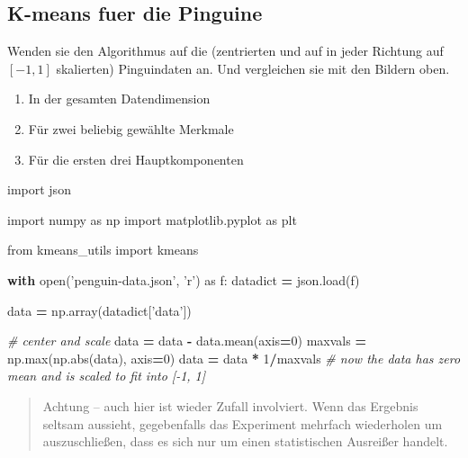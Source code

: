\documentclass[]{book}
\newenvironment{Shaded}{\begin{snugshade}}{\end{snugshade}}
\newcommand{\BuiltInTok}[1]{#1}
\newcommand{\CommentTok}[1]{\textcolor[rgb]{0.56,0.35,0.01}{\textit{#1}}}
\newcommand{\ControlFlowTok}[1]{\textcolor[rgb]{0.13,0.29,0.53}{\textbf{#1}}}
\newcommand{\DecValTok}[1]{\textcolor[rgb]{0.00,0.00,0.81}{#1}}
\newcommand{\ImportTok}[1]{#1}
\newcommand{\NormalTok}[1]{#1}
\newcommand{\OperatorTok}[1]{\textcolor[rgb]{0.81,0.36,0.00}{\textbf{#1}}}
\newcommand{\StringTok}[1]{\textcolor[rgb]{0.31,0.60,0.02}{#1}}
\providecommand{\tightlist}{%
  \setlength{\itemsep}{0pt}\setlength{\parskip}{0pt}}
\newenvironment {JHSAYS} [0] {\begin{quote}\color{jhsc}} {\end{quote}}
\theoremstyle{definition}
\theoremstyle{definition}
\theoremstyle{definition}
\theoremstyle{definition}
\theoremstyle{remark}
\begin{document}
\hypertarget{k-means-fuer-die-pinguine}{%
\subsection{K-means fuer die Pinguine}\label{k-means-fuer-die-pinguine}}

Wenden sie den Algorithmus auf die (zentrierten und auf in jeder Richtung auf \([-1, 1]\) skalierten) Pinguindaten an. Und vergleichen sie mit den Bildern oben.

\begin{enumerate}
\def\labelenumi{\arabic{enumi}.}
\tightlist
\item
  In der gesamten Datendimension
\item
  Für zwei beliebig gewählte Merkmale
\item
  Für die ersten drei Hauptkomponenten
\end{enumerate}

\begin{Shaded}
\begin{Highlighting}[]
\ImportTok{import}\NormalTok{ json}

\ImportTok{import}\NormalTok{ numpy }\ImportTok{as}\NormalTok{ np}
\ImportTok{import}\NormalTok{ matplotlib.pyplot }\ImportTok{as}\NormalTok{ plt}

\ImportTok{from}\NormalTok{ kmeans_utils }\ImportTok{import}\NormalTok{ kmeans}

\ControlFlowTok{with} \BuiltInTok{open}\NormalTok{(}\StringTok{'penguin-data.json'}\NormalTok{, }\StringTok{'r'}\NormalTok{) }\ImportTok{as}\NormalTok{ f:}
\NormalTok{    datadict }\OperatorTok{=}\NormalTok{ json.load(f)}

\NormalTok{data }\OperatorTok{=}\NormalTok{ np.array(datadict[}\StringTok{'data'}\NormalTok{])}

\CommentTok{# center and scale}
\NormalTok{data }\OperatorTok{=}\NormalTok{ data }\OperatorTok{-}\NormalTok{ data.mean(axis}\OperatorTok{=}\DecValTok{0}\NormalTok{)}
\NormalTok{maxvals }\OperatorTok{=}\NormalTok{ np.}\BuiltInTok{max}\NormalTok{(np.}\BuiltInTok{abs}\NormalTok{(data), axis}\OperatorTok{=}\DecValTok{0}\NormalTok{)}
\NormalTok{data }\OperatorTok{=}\NormalTok{ data }\OperatorTok{*} \DecValTok{1}\OperatorTok{/}\NormalTok{maxvals}
\CommentTok{# now the data has zero mean and is scaled to fit into [-1, 1]}
\end{Highlighting}
\end{Shaded}

\leavevmode\hypertarget{clustering-random}{}%
\begin{JHSAYS}
Achtung -- auch hier ist wieder Zufall involviert. Wenn das Ergebnis seltsam aussieht, gegebenfalls das Experiment mehrfach wiederholen um auszuschließen, dass es sich nur um einen statistischen Ausreißer handelt.

\end{JHSAYS}
\end{document}
